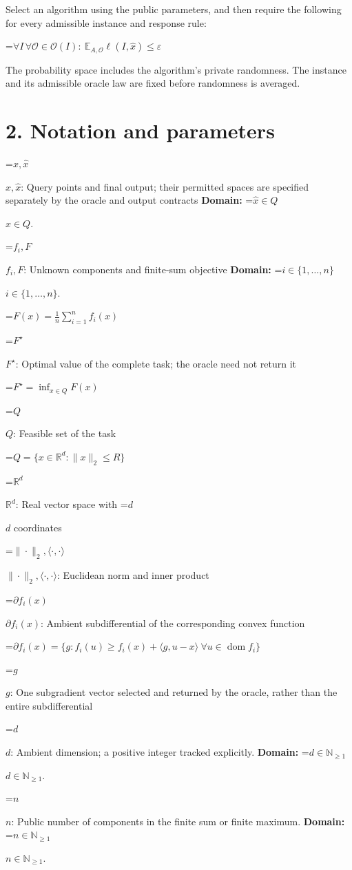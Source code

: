 \documentclass[10pt,a4paper]{article}
\newcommand{\AtlasMath}[1]{\par\begingroup\centering\setbox0=\hbox{$\displaystyle #1$}\ifdim\wd0>1.4\linewidth\typeout{ATLAS WIDE FORMULA: \the\wd0}\fi\ifdim\wd0>\linewidth\resizebox{\linewidth}{!}{\box0}\else\box0\fi\par\endgroup}
\newcommand{\AtlasInlineMath}[1]{\begingroup\setbox0=\hbox{$#1$}\ifdim\wd0>.4\linewidth\endgroup\AtlasMath{#1}\else\endgroup$#1$\fi}
\begin{document}
Select an algorithm using the public parameters, and then require the following for every admissible instance and response rule:


\AtlasMath{\forall I\,\forall\mathcal{O}\in\mathcal{O}(I):\ \mathbb{E}_{A,\mathcal{O}}\ell(I,\widehat{x})\le\varepsilon}


The probability space includes the algorithm's private randomness. The instance and its admissible oracle law are fixed before randomness is averaged.

\section{2. Notation and parameters}
\AtlasInlineMath{x,\widehat{x}}: Query points and final output; their permitted spaces are specified separately by the oracle and output contracts \textbf{Domain:} \AtlasInlineMath{\widehat{x}\in Q}.

\AtlasInlineMath{f_i,F}: Unknown components and finite-sum objective \textbf{Domain:} \AtlasInlineMath{i\in\{1,\ldots,n\}}.


\AtlasMath{F(x)=\frac1n\sum_{i=1}^n f_i(x)}


\AtlasInlineMath{F^\star}: Optimal value of the complete task; the oracle need not return it


\AtlasMath{F^\star=\inf_{x\in Q}F(x)}


\AtlasInlineMath{Q}: Feasible set of the task


\AtlasMath{Q=\{x\in\mathbb{R}^d:\|x\|_2\le R\}}


\AtlasInlineMath{\mathbb{R}^d}: Real vector space with \AtlasInlineMath{d} coordinates

\AtlasInlineMath{\|\cdot\|_2,\langle\cdot,\cdot\rangle}: Euclidean norm and inner product

\AtlasInlineMath{\partial f_i(x)}: Ambient subdifferential of the corresponding convex function


\AtlasMath{\partial f_i(x)=\{g:f_i(u)\ge f_i(x)+\langle g,u-x\rangle\ \forall u\in\operatorname{dom}f_i\}}


\AtlasInlineMath{g}: One subgradient vector selected and returned by the oracle, rather than the entire subdifferential

\AtlasInlineMath{d}: Ambient dimension; a positive integer tracked explicitly. \textbf{Domain:} \AtlasInlineMath{d\in\mathbb{N}_{\ge1}}.

\AtlasInlineMath{n}: Public number of components in the finite sum or finite maximum. \textbf{Domain:} \AtlasInlineMath{n\in\mathbb{N}_{\ge1}}.
\end{document}
